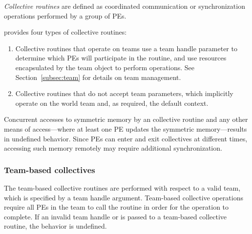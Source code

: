 \emph{Collective routines} are defined as coordinated communication or synchronization
operations performed by a group of \acp{PE}.

\openshmem provides four types of collective routines:

\begin{enumerate}
    \item Collective routines that operate on teams use a team handle parameter to determine
    which \acp{PE} will participate in the routine, and use resources encapsulated by the team object
    to perform operations. See Section~\ref{subsec:team} for details on team management.


    \item Collective routines that do not accept team
    parameters, which implicitly operate on the world team and, as
    required, the default context.
\end{enumerate}

Concurrent accesses to symmetric memory by an \openshmem collective
routine and any other means of access---where at least one \ac{PE} updates the
symmetric memory---results in undefined behavior.
Since \acp{PE} can enter and exit collectives at different times,
accessing such memory remotely may require additional synchronization.

\subsubsection*{Team-based collectives}
\label{subsec:team_collectives}

The team-based collective routines are performed with respect to a valid
\openshmem team, which is specified by a team handle argument.
Team-based collective operations require all \acp{PE} in the team to call
the routine in order for the operation to complete. If an invalid team handle
or  is passed to a team-based collective
routine, the behavior is undefined.

